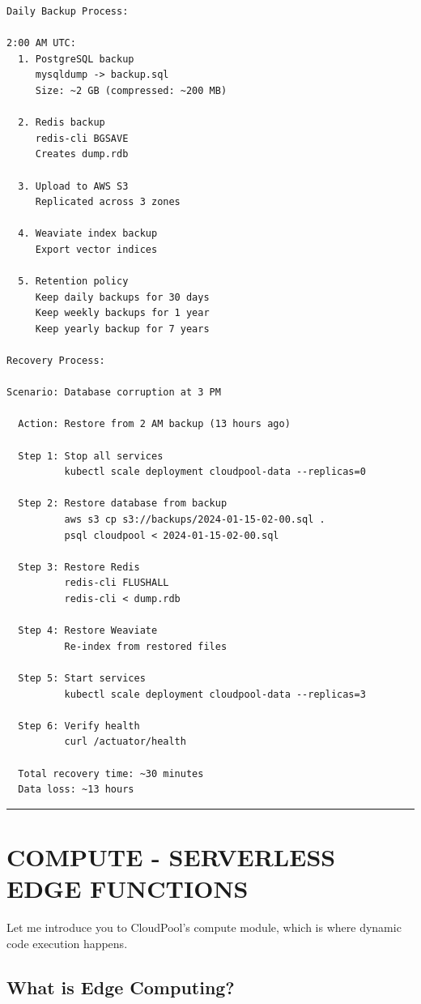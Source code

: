 \documentclass[11pt,a4paper]{report}
\begin{document}
\begin{lstlisting}[language=text]
Daily Backup Process:

2:00 AM UTC:
  1. PostgreSQL backup
     mysqldump -> backup.sql
     Size: ~2 GB (compressed: ~200 MB)
  
  2. Redis backup
     redis-cli BGSAVE
     Creates dump.rdb
  
  3. Upload to AWS S3
     Replicated across 3 zones
  
  4. Weaviate index backup
     Export vector indices
  
  5. Retention policy
     Keep daily backups for 30 days
     Keep weekly backups for 1 year
     Keep yearly backup for 7 years

Recovery Process:

Scenario: Database corruption at 3 PM
  
  Action: Restore from 2 AM backup (13 hours ago)
  
  Step 1: Stop all services
          kubectl scale deployment cloudpool-data --replicas=0
  
  Step 2: Restore database from backup
          aws s3 cp s3://backups/2024-01-15-02-00.sql .
          psql cloudpool < 2024-01-15-02-00.sql
  
  Step 3: Restore Redis
          redis-cli FLUSHALL
          redis-cli < dump.rdb
  
  Step 4: Restore Weaviate
          Re-index from restored files
  
  Step 5: Start services
          kubectl scale deployment cloudpool-data --replicas=3
  
  Step 6: Verify health
          curl /actuator/health
  
  Total recovery time: ~30 minutes
  Data loss: ~13 hours
\end{lstlisting}


\vfill\hrule\vfill



\part{COMPUTE - SERVERLESS EDGE FUNCTIONS}


Let me introduce you to CloudPool's compute module, which is where dynamic code execution happens.


\chapter{What is Edge Computing?}
\end{document}
